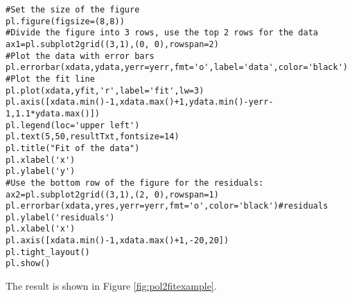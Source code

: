 \begin{lstlisting}[frame=single]
#Set the size of the figure
pl.figure(figsize=(8,8))
#Divide the figure into 3 rows, use the top 2 rows for the data
ax1=pl.subplot2grid((3,1),(0, 0),rowspan=2)
#Plot the data with error bars
pl.errorbar(xdata,ydata,yerr=yerr,fmt='o',label='data',color='black')
#Plot the fit line
pl.plot(xdata,yfit,'r',label='fit',lw=3)
pl.axis([xdata.min()-1,xdata.max()+1,ydata.min()-yerr-1,1.1*ydata.max()])
pl.legend(loc='upper left')
pl.text(5,50,resultTxt,fontsize=14)
pl.title("Fit of the data")
pl.xlabel('x')
pl.ylabel('y')
#Use the bottom row of the figure for the residuals:
ax2=pl.subplot2grid((3,1),(2, 0),rowspan=1)
pl.errorbar(xdata,yres,yerr=yerr,fmt='o',color='black')#residuals
pl.ylabel('residuals')
pl.xlabel('x')
pl.axis([xdata.min()-1,xdata.max()+1,-20,20])
pl.tight_layout()
pl.show()
\end{lstlisting}
The result is shown in Figure \ref{fig:pol2fitexample}.

 